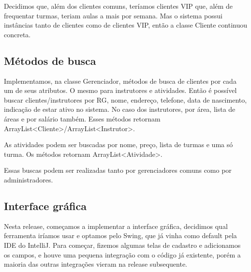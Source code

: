 \documentclass[11pt,twoside]{article}
\begin{document}
Decidimos que, além dos clientes comuns, teríamos clientes VIP que, além de frequentar turmas, teriam aulas a mais por semana. Mas o sistema
possui instâncias tanto de clientes como de clientes VIP, então a classe Cliente continuou concreta.

\subsection{Métodos de busca}
Implementamos, na classe Gerenciador, métodos de busca de clientes por cada um de seus atributos. O mesmo para instrutores e atividades.
Então é possível buscar clientes/instrutores por RG, nome, endereço, telefone, data de nascimento, indicação de estar ativo no sistema. No caso
dos instrutores, por área, lista de áreas e por salário também. Esses métodos retornam ArrayList<Cliente>/ArrayList<Instrutor>.

As atividades podem ser buscadas por nome, preço, lista de turmas e uma só turma. Os métodos retornam ArrayList<Atividade>.

Essas buscas podem ser realizadas tanto por gerenciadores comuns como por administradores.

\subsection{Interface gráfica}
Nesta release, começamos a implementar a interface gráfica, decidimos qual ferramenta iríamos usar e optamos pelo Swing, que já vinha como default pela IDE do IntelliJ.
Para começar, fizemos algumas telas de cadastro e adicionamos os campos, e houve uma pequena integração com o código já existente, porém a maioria das outras integrações vieram na release subsequente.
\end{document}
